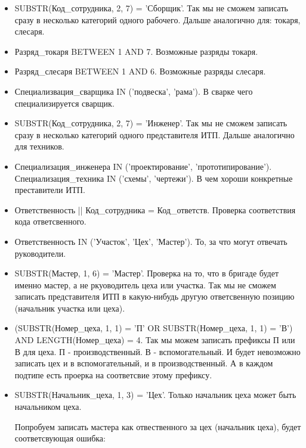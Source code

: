 \begin{itemize}
    \item SUBSTR(Код\_сотрудника, 2, 7) = 'Сборщик'.
    Так мы не сможем записать сразу в несколько категорий одного рабочего.
    Дальше аналогично для: токаря, слесаря.

    \item Разряд\_токаря BETWEEN 1 AND 7.
    Возможные разряды токаря.

    \item Разряд\_слесаря BETWEEN 1 AND 6.
    Возможные разряды слесаря.

    \item Специализвация\_сварщика IN ('подвеска', 'рама').
    В сварке чего специализируется сварщик.

    \item SUBSTR(Код\_сотрудника, 2, 7) = 'Инженер'.
    Так мы не сможем записать сразу в несколько категорий одного представителя ИТП.
    Дальше аналогично для техников.

    \item Специализация\_инженера IN ('проектирование', 'прототипирование').
    Специализация\_техника IN ('схемы', 'чертежи').
    В чем хороши конкретные преставители ИТП.

    \item Ответственность || Код\_сотрудника = Код\_ответств.
    Проверка соответствия кода ответсвенного.

    \item Ответственность IN ('Участок', 'Цех', 'Мастер').
    То, за что могут отвечать руководители.

    \item SUBSTR(Мастер, 1, 6) = 'Мастер'.
    Проверка на то, что в бригаде будет именно мастер, а не ркуоводитель цеха или участка.
    Так мы не сможем записать представителя ИТП в какую-нибудь другую ответсвенную позицию (начальник участка или цеха).

    \item (SUBSTR(Номер\_цеха, 1, 1) = 'П' OR SUBSTR(Номер\_цеха, 1, 1) = 'В') AND LENGTH(Номер\_цеха) = 4.
    Так мы можем записать префиксы П или В для цеха.
    П - производственный.
    В - вспомогательный.
    И будет невозможно записать цех и в вспомогательный, и в производственный. А в каждом подтипе есть проерка на соответсвие этому префиксу.

    \item SUBSTR(Начальник\_цеха, 1, 3) = 'Цех'.
    Только начальник цеха может быть начальником цеха.

    Попробуем записать мастера как отвественного за цех (начальник цеха), будет соответсвующая ошибка:


\end{itemize}
